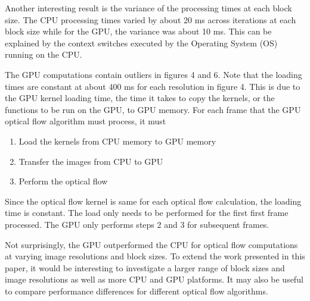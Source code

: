 \documentclass[12pt,letterpaper]{article}
\begin{document}
Another interesting result is the variance of the processing times at each 
block size. The CPU processing times varied by about 20 ms across iterations at
each block size while for the GPU, the variance was about 10 ms. This can be
explained by the context switches executed by the Operating System (OS) running
on the CPU. 

The GPU computations contain outliers in figures 4 and 6. Note that the loading
times are constant at about 400 ms for each resolution in figure 4. This is due
to the GPU kernel loading time, the time it takes to copy the kernels, or the
functions to be run on the GPU, to GPU memory. For each frame that the GPU 
optical flow algorithm must process, it must 
\begin{enumerate}
    \item Load the kernels from CPU memory to GPU memory
    \item Transfer the images from CPU to GPU
    \item Perform the optical flow
\end{enumerate}
Since the optical flow kernel is same for each optical flow calculation, the
loading time is constant. The load only needs to be performed for the first 
first frame processed. The GPU only performs steps 2 and 3 for subsequent 
frames.

Not surprisingly, the GPU outperformed the CPU for optical flow computations at
varying image resolutions and block sizes. To extend the work presented in this
paper, it would be interesting to investigate a larger range of block sizes and
image resolutions as well as more CPU and GPU platforms. It may also be useful
to compare performance differences for different optical flow algorithms. 
\nocite{*}


\end{document}
